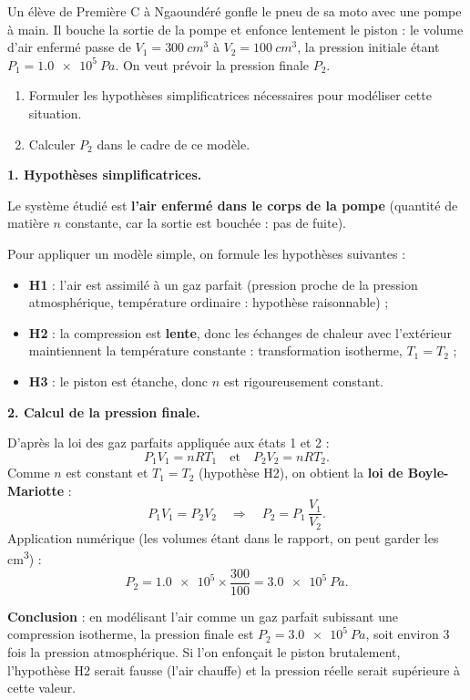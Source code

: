 \documentclass[11pt]{article}
\newcommand{\cle}[1]{{\popxbold\color{popdark}#1}}
\begin{document}
\begin{exoresolu}
Un élève de Première C à Ngaoundéré gonfle le pneu de sa moto avec une pompe à main. Il bouche la sortie de la pompe et enfonce lentement le piston : le volume d'air enfermé passe de $V_1 = \SI{300}{cm^3}$ à $V_2 = \SI{100}{cm^3}$, la pression initiale étant $P_1 = \SI{1,0e5}{Pa}$. On veut prévoir la pression finale $P_2$.
\begin{enumerate}
\item Formuler les hypothèses simplificatrices nécessaires pour modéliser cette situation.
\item Calculer $P_2$ dans le cadre de ce modèle.
\end{enumerate}
\tcblower
\textbf{1. Hypothèses simplificatrices.}

Le système étudié est \textbf{l'air enfermé dans le corps de la pompe} (quantité de matière $n$ constante, car la sortie est bouchée : pas de fuite).

Pour appliquer un modèle simple, on formule les hypothèses suivantes :
\begin{itemize}
\item \textbf{H1} : l'air est assimilé à un \cle{gaz parfait} (pression proche de la pression atmosphérique, température ordinaire : hypothèse raisonnable) ;
\item \textbf{H2} : la compression est \textbf{lente}, donc les échanges de chaleur avec l'extérieur maintiennent la température constante : transformation \cle{isotherme}, $T_1 = T_2$ ;
\item \textbf{H3} : le piston est étanche, donc $n$ est rigoureusement constant.
\end{itemize}

\textbf{2. Calcul de la pression finale.}

D'après la loi des gaz parfaits appliquée aux états 1 et 2 :
\[ P_1V_1 = nRT_1 \quad \text{et} \quad P_2V_2 = nRT_2. \]
Comme $n$ est constant et $T_1 = T_2$ (hypothèse H2), on obtient la \textbf{loi de Boyle-Mariotte} :
\[ P_1V_1 = P_2V_2 \quad \Longrightarrow \quad P_2 = P_1\,\dfrac{V_1}{V_2}. \]
Application numérique (les volumes étant dans le rapport, on peut garder les \si{cm^3}) :
\[ P_2 = \num{1,0e5} \times \dfrac{300}{100} = \SI{3,0e5}{Pa}. \]

\textbf{Conclusion} : en modélisant l'air comme un gaz parfait subissant une compression isotherme, la pression finale est $P_2 = \SI{3,0e5}{Pa}$, soit environ 3 fois la pression atmosphérique. Si l'on enfonçait le piston brutalement, l'hypothèse H2 serait fausse (l'air chauffe) et la pression réelle serait supérieure à cette valeur.
\end{exoresolu}
\end{document}
